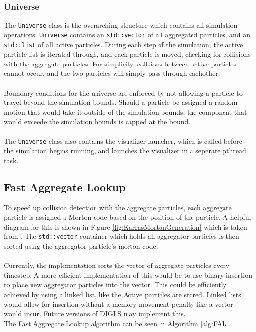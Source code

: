 \documentclass[fleqn,10pt]{UserGuideArx} %
\begin{document}
\subsubsection{Universe}
The \texttt{Universe} class is the overarching structure which contains all simulation operations. \texttt{Universe} contains an \texttt{std\allowbreak::vector} of all aggregated particles, and an \texttt{std\allowbreak::list} of all active particles. During each step of the simulation, the active particle list is iterated through, and each particle is moved, checking for collisions with the aggregate particles. For simplicity, collsions between active particles cannot occur, and the two particles will simply pass through eachother. \\~\\
Boundary conditions for the universe are enforced by not allowing a particle to travel beyond the simulation bounds. Should a particle be assigned a random motion that would take it outside of the simulation bounds, the component that would exceede the simulation bounds is capped at the bound. \\~\\
The \texttt{Universe} class also contains the visualizer launcher, which is called before the simulation begins running, and launches the visualizer in a seperate pthread task.\\

\subsection{Fast Aggregate Lookup}
To speed up collision detection with the aggregate particles, each aggregate particle is assigned a Morton code based on the position of the particle. A helpful diagram for this is shown in Figure \ref{fig:KarrasMortonGeneration} which is taken from \cite{Karras:2012}. The \texttt{std\allowbreak::vector} container which holds all aggregator particles is then sorted using the aggregator particle's morton code. \\~\\
Currently, the implementation sorts the vector of aggregate particles every timestep. A more efficient implementation of this would be to use binary insertion to place new aggregator particles into the vector. This could be efficiently achieved by using a linked list, like the Active particles are stored. Linked lists would allow for insertion without a memory movement penalty like a vector would incur. Future versions of DIGLS may implement this.\\
The Fast Aggregate Lookup algorithm can be seen in Algorithm \ref{alg:FAL}.
\end{document}
